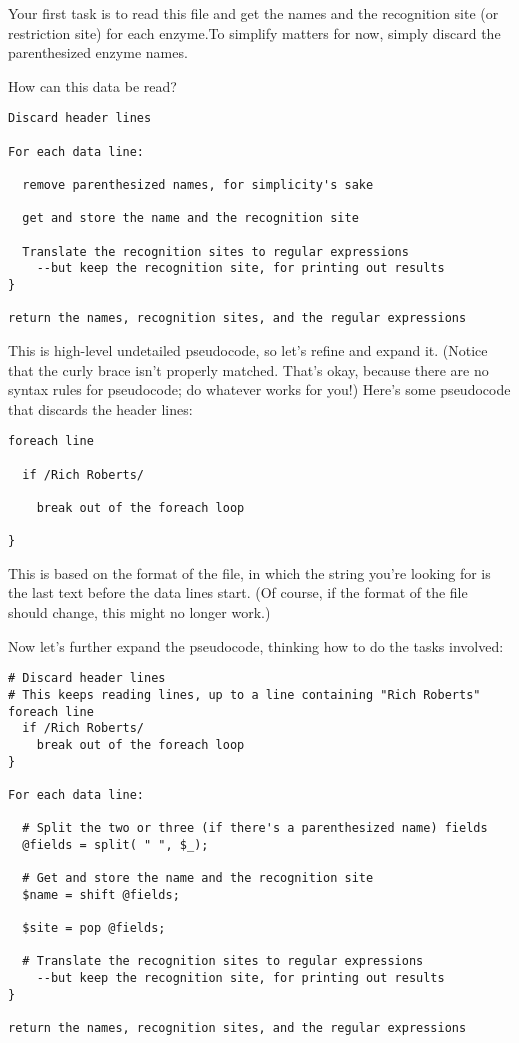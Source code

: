 Your first task is to read this file and get the names and the recognition site (or restriction site) for each enzyme.To simplify matters for now, simply discard the parenthesized enzyme names.

How can this data be read?

\begin{lstlisting}
Discard header lines 

For each data line:

  remove parenthesized names, for simplicity's sake

  get and store the name and the recognition site

  Translate the recognition sites to regular expressions
    --but keep the recognition site, for printing out results
}

return the names, recognition sites, and the regular expressions
\end{lstlisting}

This is high-level undetailed pseudocode, so let's refine and expand it.  (Notice that the curly brace isn't properly matched. That's okay, because there are no syntax rules for pseudocode; do whatever works for you!) Here's some pseudocode that discards the header lines: 

\begin{lstlisting}
foreach line 

  if /Rich Roberts/ 

    break out of the foreach loop

}
\end{lstlisting}

This is based on the format of the file, in which the string you're looking for is the last text before the data lines start. (Of course, if the format of the file should change, this might no longer work.)

Now let's further expand the pseudocode, thinking how to do the tasks involved: 

\begin{lstlisting}
# Discard header lines
# This keeps reading lines, up to a line containing "Rich Roberts"
foreach line 
  if /Rich Roberts/ 
    break out of the foreach loop
}

For each data line:

  # Split the two or three (if there's a parenthesized name) fields
  @fields = split( " ", $_);

  # Get and store the name and the recognition site
  $name = shift @fields;

  $site = pop @fields;

  # Translate the recognition sites to regular expressions
    --but keep the recognition site, for printing out results
}

return the names, recognition sites, and the regular expressions
\end{lstlisting}

